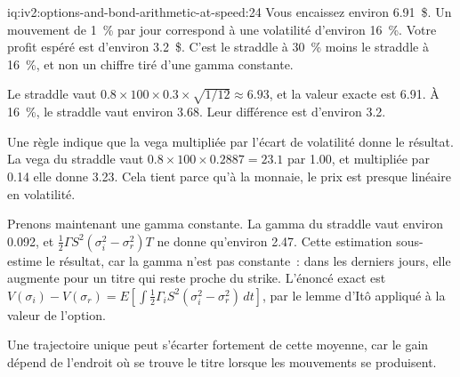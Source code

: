 \begin{solution}{iq:iv2:options-and-bond-arithmetic-at-speed:24}
Vous encaissez environ 6.91~\$. Un mouvement de 1~\% par jour correspond à une volatilité d'environ 16~\%. Votre profit espéré est d'environ 3.2~\$. C'est le straddle à 30~\% moins le straddle à 16~\%, et non un chiffre tiré d'une gamma constante.

Le straddle vaut $0.8 \times 100 \times 0.3 \times \sqrt{1/12} \approx 6.93$, et la valeur exacte est 6.91. À 16~\%, le straddle vaut environ 3.68. Leur différence est d'environ 3.2.

Une règle indique que la vega multipliée par l'écart de volatilité donne le résultat. La vega du straddle vaut $0.8 \times 100 \times 0.2887 = 23.1$ par 1.00, et multipliée par 0.14 elle donne 3.23. Cela tient parce qu'à la monnaie, le prix est presque linéaire en volatilité.

Prenons maintenant une gamma constante. La gamma du straddle vaut environ 0.092, et $\tfrac12\Gamma S^2(\sigma_i^2 - \sigma_r^2)T$ ne donne qu'environ 2.47. Cette estimation sous-estime le résultat, car la gamma n'est pas constante~: dans les derniers jours, elle augmente pour un titre qui reste proche du strike. L'énoncé exact est $V(\sigma_i) - V(\sigma_r) = E\left[\int \tfrac12\Gamma_i S^2(\sigma_i^2 - \sigma_r^2)\,dt\right]$, par le lemme d'Itô appliqué à la valeur de l'option.

Une trajectoire unique peut s'écarter fortement de cette moyenne, car le gain dépend de l'endroit où se trouve le titre lorsque les mouvements se produisent.

\end{solution}

